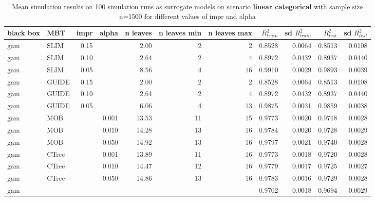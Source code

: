 \begin{table}
\begin{tabular}[t]{l|l|r|r|r|r|r|r|r|r|r}
\hline
\end{tabular}
\label{tab:app_linear_smooth_5000}

\end{table}



\begin{table}

\caption{Mean simulation results on 100 simulation runs as surrogate models  on scenario \textbf{linear categorical} with sample size n=1500 for different values of impr and alpha}
\centering \tiny
\begin{tabular}[t]{l|l|r|r|r|r|r|r|r|r|r}
\hline
black box & MBT & impr & alpha & n leaves & n leaves min & n leaves max &  $R^2_{train}$ & sd $R^2_{train}$ & $R^2_{test}$ & sd $R^2_{test}$\\
\hline
gam & SLIM & 0.15 & & 2.00 & 2 & 2 & 0.8528 & 0.0064 & 0.8513 & 0.0108\\
gam & SLIM & 0.10 & & 2.64 & 2 & 4 & 0.8972 & 0.0432 & 0.8937 & 0.0440\\
gam & SLIM & 0.05 & & 8.56 & 4 & 16 & 0.9910 & 0.0029 & 0.9893 & 0.0039\\
gam & GUIDE & 0.15 & & 2.00 & 2 & 2 & 0.8528 & 0.0064 & 0.8513 & 0.0108\\
gam & GUIDE & 0.10 & & 2.64 & 2 & 4 & 0.8972 & 0.0432 & 0.8937 & 0.0440\\
gam & GUIDE & 0.05 & & 6.06 & 4 & 13 & 0.9875 & 0.0031 & 0.9859 & 0.0038\\
gam & MOB & & 0.001 & 13.53 & 11 & 15 & 0.9773 & 0.0020 & 0.9718 & 0.0028\\
gam & MOB & & 0.010 & 14.28 & 13 & 16 & 0.9784 & 0.0020 & 0.9728 & 0.0029\\
gam & MOB & & 0.050 & 14.92 & 13 & 16 & 0.9797 & 0.0021 & 0.9740 & 0.0028\\
gam & CTree & & 0.001 & 13.89 & 11 & 16 & 0.9773 & 0.0018 & 0.9720 & 0.0028\\
gam & CTree & & 0.010 & 14.47 & 12 & 16 & 0.9779 & 0.0017 & 0.9725 & 0.0027\\
gam & CTree & & 0.050 & 14.86 & 13 & 16 & 0.9783 & 0.0016 & 0.9729 & 0.0028\\
\hline
gam & & & & & & & 0.9702 & 0.0018 & 0.9694 & 0.0029\\
\hline


\end{tabular}
\end{table}
